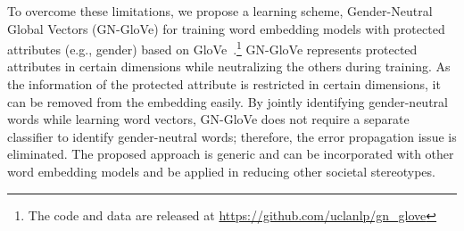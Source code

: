 To overcome these limitations, we propose a learning scheme, Gender-Neutral Global Vectors (GN-GloVe) for training word embedding models with protected attributes (e.g., gender) based on GloVe~\cite{glove}.\footnote{The code and data are released at \url{https://github.com/uclanlp/gn\_glove}} 
GN-GloVe represents protected attributes in certain dimensions while neutralizing the others during  training. As the information of the protected attribute is restricted in  certain dimensions, it can be removed from the embedding easily. By jointly identifying gender-neutral words while learning word vectors, 
GN-GloVe does not require a separate classifier to identify  gender-neutral words; therefore, the error propagation issue is eliminated. 
The proposed approach is generic and can be incorporated with other word embedding models and be
applied in reducing other societal stereotypes. 



